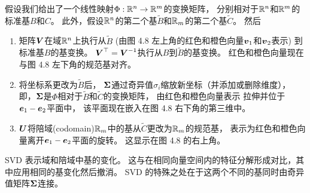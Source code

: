 假设我们给出了一个线性映射$\Phi : \mathbb{R}^n \rightarrow \mathbb{R}^m$的变换矩阵，
分别相对于$\mathbb{R}^n$和$\mathbb{R}^m$的标准基$B$和$C$。
此外，假设$\mathbb{R}^n$的第二个基$\tilde{B}$和$\mathbb{R}_m$的第二个基$\tilde{C}$。
然后
\begin{enumerate}
    \item
    矩阵$\boldsymbol{V}$在域$\mathbb{R}^n$上执行从$\tilde{B}$
    (由图 4.8 左上角的红色和橙色向量$\boldsymbol{v}_1$和$\boldsymbol{v}_2$表示)
    到标准基$B$的基变换。
    $\boldsymbol{V}^\top = \boldsymbol{V}^{-1}$执行从$B$到$\tilde{B}$的基变换。
    红色和橙色向量现在与图 4.8 左下角的规范基对齐。
    \item
    将坐标系更改为$\tilde{B}$后，
    $\boldsymbol{\Sigma}$通过奇异值$\sigma_i$缩放新坐标（并添加或删除维度），
    即，$\boldsymbol{\Sigma}$是$\Phi$相对于$\tilde{B}$和$\tilde{C}$的变换矩阵，
    由红色和橙色向量表示 拉伸并位于$\boldsymbol{e}_1-\boldsymbol{e}_2$平面中，
    该平面现在嵌入在图 4.8 右下角的第三维中。
    \item
    $\boldsymbol{U}$将陪域(codomain)$\mathbb{R}_m$中的基从$\tilde{C}$更改为$\mathbb{R}_m$的规范基，
    表示为红色和橙色向量离开$\boldsymbol{e}_1 - \boldsymbol{e}_2$平面的旋转。
    这显示在图 4.8 的右上角。
\end{enumerate}
SVD 表示域和陪域中基的变化。
这与在相同向量空间内的特征分解形成对比，其中应用相同的基变化然后撤消。
SVD 的特殊之处在于这两个不同的基同时由奇异值矩阵$\boldsymbol{\Sigma}$连接。

